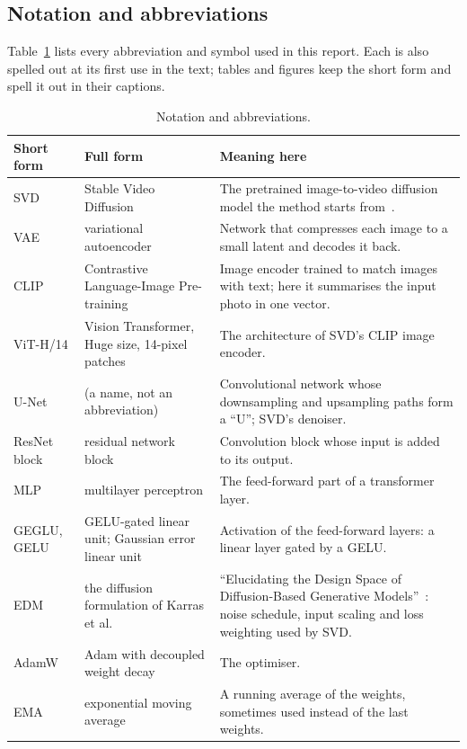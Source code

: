 \documentclass[11pt]{article}
\begin{document}
\subsection*{Notation and abbreviations}
Table~\ref{tab:notation} lists every abbreviation and symbol used in this report. Each is also spelled out at its first use in the text; tables and figures keep the short form and spell it out in their captions.
\begin{table}[p]\centering\footnotesize\renewcommand{\arraystretch}{1.05}
\caption{Notation and abbreviations.}\label{tab:notation}
\begin{tabular}{@{}>{\raggedright\arraybackslash}p{2.2cm}>{\raggedright\arraybackslash}p{5.2cm}>{\raggedright\arraybackslash}p{8.0cm}@{}}\toprule
Short form & Full form & Meaning here\\\midrule
SVD & Stable Video Diffusion & The pretrained image-to-video diffusion model the method starts from~\cite{blattmann2023svd}.\\
VAE & variational autoencoder & Network that compresses each image to a small latent and decodes it back.\\
CLIP & Contrastive Language-Image Pre-training & Image encoder trained to match images with text; here it summarises the input photo in one vector.\\
ViT-H/14 & Vision Transformer, Huge size, 14-pixel patches & The architecture of SVD's CLIP image encoder.\\
U-Net & (a name, not an abbreviation) & Convolutional network whose downsampling and upsampling paths form a ``U''; SVD's denoiser.\\
ResNet block & residual network block & Convolution block whose input is added to its output.\\
MLP & multilayer perceptron & The feed-forward part of a transformer layer.\\
GEGLU, GELU & GELU-gated linear unit; Gaussian error linear unit & Activation of the feed-forward layers: a linear layer gated by a GELU.\\
EDM & the diffusion formulation of Karras et al. & ``Elucidating the Design Space of Diffusion-Based Generative Models''~\cite{karras2022edm}: noise schedule, input scaling and loss weighting used by SVD.\\
AdamW & Adam with decoupled weight decay & The optimiser.\\
EMA & exponential moving average & A running average of the weights, sometimes used instead of the last weights.\\

\end{tabular}
\end{table}
\end{document}
